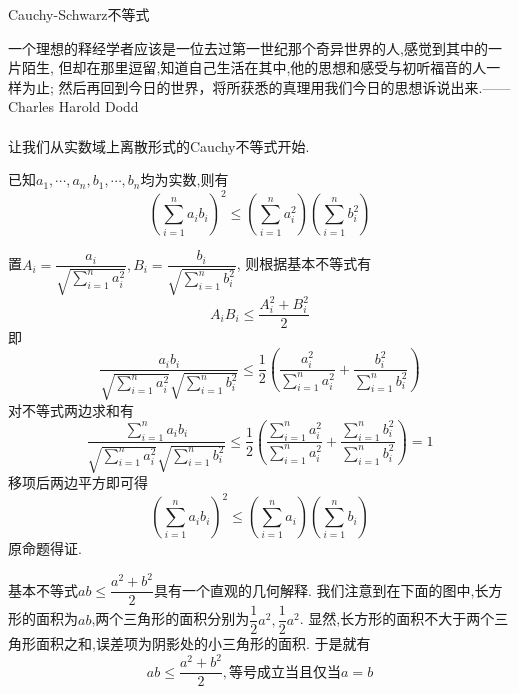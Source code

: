 \documentclass{ctexart}
\begin{document}
\pagestyle{empty}
\begin{center}\large Cauchy-Schwarz不等式\end{center}
一个理想的释经学者应该是一位去过第一世纪那个奇异世界的人,感觉到其中的一片陌生,
但却在那里逗留,知道自己生活在其中,他的思想和感受与初听福音的人一样为止;
然后再回到今日的世界，将所获悉的真理用我们今日的思想诉说出来.\hfill—— Charles Harold Dodd\\\ \\
让我们从实数域上离散形式的Cauchy不等式开始.
\begin{formal}[1.1]
    已知$a_1,\cdots,a_n,b_1,\cdots,b_n$均为实数,则有
    $$\left(\sum_{i=1}^{n}a_ib_i\right)^2\leqslant\left(\sum_{i=1}^{n}a_i^2\right)\left(\sum_{i=1}^{n}b_i^2\right)$$
\end{formal}
\begin{solution}[Proof.]
    置$\displaystyle A_i=\dfrac{a_i}{\sqrt{\sum_{i=1}^{n}a_i^2}},B_i=\dfrac{b_i}{\sqrt{\sum_{i=1}^{n}b_i^2}}$,
    则根据基本不等式有$$A_iB_i\leqslant\dfrac{A_i^2+B_i^2}{2}$$
    即$$\dfrac{a_ib_i}{\sqrt{\sum_{i=1}^{n}a_i^2}\sqrt{\sum_{i=1}^{n}b_i^2}}\leqslant\dfrac{1}{2}\left(\dfrac{a_i^2}{\sum_{i=1}^{n}a_i^2}+\dfrac{b_i^2}{\sum_{i=1}^{n}b_i^2}\right)$$
    对不等式两边求和有$$\dfrac{\sum_{i=1}^{n}a_ib_i}{\sqrt{\sum_{i=1}^{n}a_i^2}\sqrt{\sum_{i=1}^{n}b_i^2}}\leqslant\dfrac{1}{2}\left(\dfrac{\sum_{i=1}^{n}a_i^2}{\sum_{i=1}^{n}a_i^2}+\dfrac{\sum_{i=1}^{n}b_i^2}{\sum_{i=1}^{n}b_i^2}\right)=1$$
    移项后两边平方即可得$$\left(\sum_{i=1}^{n}a_ib_i\right)^2\leqslant\left(\sum_{i=1}^{n}a_i\right)\left(\sum_{i=1}^{n}b_i\right)$$
    原命题得证.
\end{solution}\noindent
基本不等式$ab\leqslant\dfrac{a^2+b^2}{2}$具有一个直观的几何解释.
我们注意到在下面的图中,长方形的面积为$ab$,两个三角形的面积分别为$\dfrac{1}{2}a^2,\dfrac{1}{2}a^2$.
显然,长方形的面积不大于两个三角形面积之和,误差项为阴影处的小三角形的面积.
于是就有$$ab\leqslant\dfrac{a^2+b^2}{2},\text{等号成立当且仅当}a=b$$
\begin{center}
\end{center}
\end{document}

